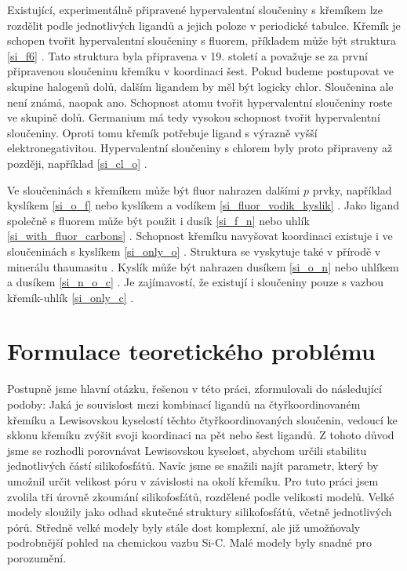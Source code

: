 \documentclass[
digital, %
table,   %
lof,     %
lot,     %
oneside,
]{fithesis3}
\begin{document}
Existující, experimentálně připravené hypervalentní sloučeniny s křemíkem lze rozdělit podle jednotlivých ligandů a jejich poloze v periodické tabulce. Křemík je schopen tvořit hypervalentní sloučeniny s fluorem, příkladem může být struktura   \ref{si_f6} \cite{memoriesphysiquelussac}. Tato struktura byla připravena v 19. století a považuje se za první připravenou sloučeninu křemíku v koordinaci šest. Pokud budeme postupovat ve skupine halogenů dolů, dalším ligandem by měl být logicky chlor. Sloučenina  ale není známá, naopak  ano. Schopnost atomu tvořit hypervalentní sloučeniny roste ve skupině dolů. Germanium má tedy vysokou schopnost tvořit hypervalentní sloučeniny. Oproti tomu křemík potřebuje ligand s výrazně vyšší elektronegativitou. Hypervalentní sloučeniny s chlorem byly proto připraveny až později, například \ref{si_cl_o} \cite{LAZAREV199716}.

Ve sloučeninách s křemíkem může být fluor nahrazen dalšími $p$ prvky, například kyslíkem \ref{si_o_f} \cite{C0DT01115K} nebo kyslíkem a vodíkem \ref{si_fluor_vodik_kyslik} \cite{BOYER19812165}.
Jako ligand společně s fluorem může být použit i dusík \ref{si_f_n} \cite{C0DT01115K} nebo uhlík \ref{si_with_fluor_carbons} \cite{kremikfluorcarbon}. Schopnost křemíku navyšovat koordinaci existuje i ve sloučeninách s kyslíkem \ref{si_only_o} \cite{flyn1969}.  Struktura  se vyskytuje také v přírodě v minerálu thaumasitu \cite{Edge:a08100}. Kyslík může být nahrazen dusíkem  \ref{si_o_n} \cite{Wagler2014} nebo uhlíkem a dusíkem  \ref{si_n_o_c} \cite{Wagler2014}. Je zajímavostí, že existují i sloučeniny pouze s vazbou křemík-uhlík \ref{si_only_c} \cite{A901953G} \cite{Wagler2014}.

\section{Formulace teoretického problému}
Postupně jsme hlavní otázku, řešenou v této práci, zformulovali do následující podoby: Jaká je souvislost mezi kombinací ligandů na čtyřkoordinovaném křemíku a Lewisovskou kyselostí těchto čtyřkoordinovaných sloučenin, vedoucí ke sklonu křemíku zvýšit svoji koordinaci na pět nebo šest ligandů.
Z tohoto důvod jsme se rozhodli porovnávat Lewisovskou kyselost, abychom určili stabilitu jednotlivých částí silikofosfátů. Navíc jsme se snažili najít parametr, který by umožnil určit velikost póru v závislosti na okolí křemíku. Pro tuto práci jsem zvolila tři úrovně zkoumání silikofosfátů, rozdělené podle velikosti modelů. Velké modely sloužily jako odhad skutečné struktury silikofosfátů, včetně jednotlivých pórů. Středně velké modely byly stále dost komplexní, ale již umožňovaly podrobnější pohled na chemickou vazbu Si-C. Malé modely byly snadné pro porozumění.
\end{document}
